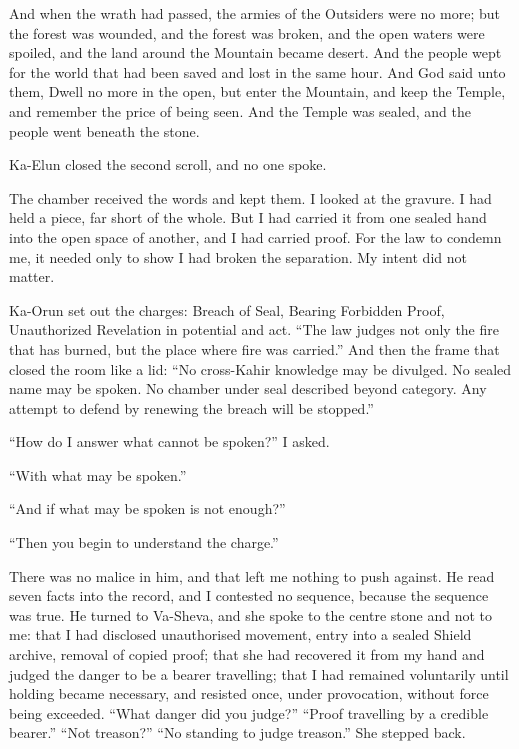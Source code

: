 \begin{scripture}
And when the wrath had passed, the armies of the Outsiders were no more; but the forest was wounded, and the forest was broken, and the open waters were spoiled, and the land around the Mountain became desert.
And the people wept for the world that had been saved and lost in the same hour.
And God said unto them, Dwell no more in the open, but enter the Mountain, and keep the Temple, and remember the price of being seen.
And the Temple was sealed, and the people went beneath the stone.
\end{scripture}
 
Ka-Elun closed the second scroll, and no one spoke.\par
 
The chamber received the words and kept them. I looked at the gravure. I had held a piece, far short of the whole. But I had carried it from one sealed hand into the open space of another, and I had carried proof. For the law to condemn me, it needed only to show I had broken the separation. My intent did not matter.\par
 
Ka-Orun set out the charges: Breach of Seal, Bearing Forbidden Proof, Unauthorized Revelation in potential and act. ``The law judges not only the fire that has burned, but the place where fire was carried.'' And then the frame that closed the room like a lid: ``No cross-Kahir knowledge may be divulged. No sealed name may be spoken. No chamber under seal described beyond category. Any attempt to defend by renewing the breach will be stopped.''\par
 
``How do I answer what cannot be spoken?'' I asked.\par
 
``With what may be spoken.''\par
 
``And if what may be spoken is not enough?''\par
 
``Then you begin to understand the charge.''\par
 
There was no malice in him, and that left me nothing to push against. He read seven facts into the record, and I contested no sequence, because the sequence was true. He turned to Va-Sheva, and she spoke to the centre stone and not to me: that I had disclosed unauthorised movement, entry into a sealed Shield archive, removal of copied proof; that she had recovered it from my hand and judged the danger to be a bearer travelling; that I had remained voluntarily until holding became necessary, and resisted once, under provocation, without force being exceeded. ``What danger did you judge?'' ``Proof travelling by a credible bearer.'' ``Not treason?'' ``No standing to judge treason.'' She stepped back.\par
 
